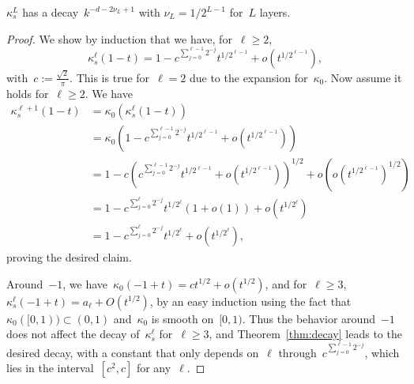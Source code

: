 \begin{corollary}
$\kappa_s^L$ has a decay~$k^{-d-2 \nu_L+1}$ with $\nu_L = 1/2^{L-1}$ for~$L$ layers.
\end{corollary}
\begin{proof}
We show by induction that we have, for~$\ell \geq 2$,
\begin{equation*}
\kappa_s^\ell(1-t) = 1 - c^{\sum_{j=0}^{\ell-1} 2^{-j}} t^{1/2^{\ell-1}} + o(t^{1/2^{\ell-1}}),
\end{equation*}
with~$c := \frac{\sqrt{2}}{\pi}$.
This is true for~$\ell = 2$ due to the expansion for~$\kappa_0$.
Now assume it holds for~$\ell \geq 2$. We have
\begin{align*}
\kappa_s^{\ell+1}(1-t) &= \kappa_0(\kappa_s^{\ell}(1-t)) \\
	&= \kappa_0 \left(1 - c^{\sum_{j=0}^{\ell-1} 2^{-j}} t^{1/2^{\ell-1}} + o(t^{1/2^{\ell-1}})\right) \\
	&= 1 - c \left(c^{\sum_{j=0}^{\ell-1} 2^{-j}} t^{1/2^{\ell-1}} + o(t^{1/2^{\ell-1}}) \right)^{1/2} + o(o(t^{1/2^{\ell-1}})^{1/2}) \\
	&= 1 - c^{\sum_{j=0}^{\ell} 2^{-j}} t^{1/2^{\ell}} (1 + o(1)) + o(t^{1/2^\ell}) \\
	&= 1 - c^{\sum_{j=0}^{\ell} 2^{-j}} t^{1/2^{\ell}} + o(t^{1/2^\ell}),
\end{align*}
proving the desired claim.

Around~$-1$, we have~$\kappa_0(-1+t) = c t^{1/2} + o(t^{1/2})$, and for~$\ell \geq 3$, $\kappa_s^{\ell}(-1+t) = a_\ell + O(t^{1/2})$, by an easy induction using the fact that~$\kappa_0([0,1)) \subset (0, 1)$ and~$\kappa_0$ is smooth on~$[0,1)$. Thus the behavior around~$-1$ does not affect the decay of~$\kappa_s^\ell$ for~$\ell \geq 3$, and Theorem~\ref{thm:decay} leads to the desired decay, with a constant that only depends on~$\ell$ through~$c^{\sum_{j=0}^{\ell-1} 2^{-j}}$, which lies in the interval~$[c^2, c]$ for any~$\ell$.
\end{proof}


